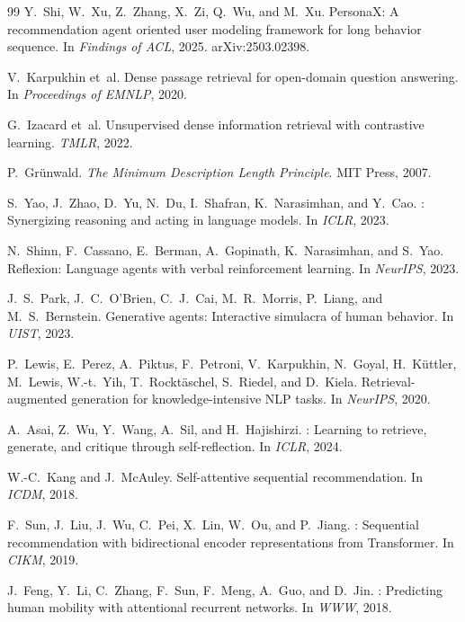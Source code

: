 \documentclass[sigconf,review,anonymous]{acmart}
\begin{document}
\begin{thebibliography}{99}
Y.~Shi, W.~Xu, Z.~Zhang, X.~Zi, Q.~Wu, and M.~Xu.
\newblock PersonaX: A recommendation agent oriented user modeling framework for long behavior sequence.
\newblock In \textit{Findings of ACL}, 2025. arXiv:2503.02398.

V.~Karpukhin et~al.
\newblock Dense passage retrieval for open-domain question answering.
\newblock In \textit{Proceedings of EMNLP}, 2020.

G.~Izacard et~al.
\newblock Unsupervised dense information retrieval with contrastive learning.
\newblock \textit{TMLR}, 2022.

P.~Gr{\"u}nwald.
\newblock \textit{The Minimum Description Length Principle}.
\newblock MIT Press, 2007.

S.~Yao, J.~Zhao, D.~Yu, N.~Du, I.~Shafran, K.~Narasimhan, and Y.~Cao.
: Synergizing reasoning and acting in language models.
\newblock In \textit{ICLR}, 2023.

N.~Shinn, F.~Cassano, E.~Berman, A.~Gopinath, K.~Narasimhan, and S.~Yao.
\newblock Reflexion: Language agents with verbal reinforcement learning.
\newblock In \textit{NeurIPS}, 2023.

J.~S.~Park, J.~C.~O'Brien, C.~J.~Cai, M.~R.~Morris, P.~Liang, and M.~S.~Bernstein.
\newblock Generative agents: Interactive simulacra of human behavior.
\newblock In \textit{UIST}, 2023.

P.~Lewis, E.~Perez, A.~Piktus, F.~Petroni, V.~Karpukhin, N.~Goyal, H.~K{\"u}ttler, M.~Lewis, W.-t.~Yih, T.~Rockt{\"a}schel, S.~Riedel, and D.~Kiela.
\newblock Retrieval-augmented generation for knowledge-intensive {NLP} tasks.
\newblock In \textit{NeurIPS}, 2020.

A.~Asai, Z.~Wu, Y.~Wang, A.~Sil, and H.~Hajishirzi.
: Learning to retrieve, generate, and critique through self-reflection.
\newblock In \textit{ICLR}, 2024.

W.-C.~Kang and J.~McAuley.
\newblock Self-attentive sequential recommendation.
\newblock In \textit{ICDM}, 2018.

F.~Sun, J.~Liu, J.~Wu, C.~Pei, X.~Lin, W.~Ou, and P.~Jiang.
: Sequential recommendation with bidirectional encoder representations from {Transformer}.
\newblock In \textit{CIKM}, 2019.

J.~Feng, Y.~Li, C.~Zhang, F.~Sun, F.~Meng, A.~Guo, and D.~Jin.
: Predicting human mobility with attentional recurrent networks.
\newblock In \textit{WWW}, 2018.


\end{thebibliography}
\end{document}
